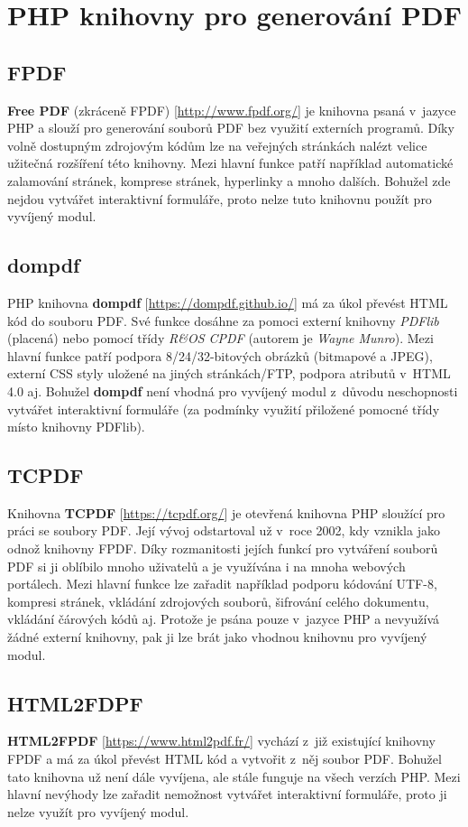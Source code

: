 \section{PHP knihovny pro generování PDF}
\subsection{FPDF}
\textbf{Free PDF} (zkráceně FPDF) [\url{http://www.fpdf.org/}] je knihovna psaná v~jazyce PHP a slouží pro generování souborů PDF bez využití externích programů. Díky volně dostupným zdrojovým kódům lze na veřejných stránkách nalézt velice užitečná rozšíření této knihovny. Mezi hlavní funkce patří například automatické zalamování stránek, komprese stránek, hyperlinky a mnoho dalších. Bohužel zde nejdou vytvářet interaktivní formuláře, proto nelze tuto knihovnu použít pro vyvíjený modul.
\subsection{dompdf}
PHP knihovna \textbf{dompdf} [\url{https://dompdf.github.io/}] má za úkol převést HTML kód do souboru PDF. Své funkce dosáhne za pomoci externí knihovny \textit{PDFlib} (placená) nebo pomocí třídy \textit{R\&OS CPDF} (autorem je \textit{Wayne Munro}). Mezi hlavní funkce patří podpora 8/24/32-bitových obrázků (bitmapové a JPEG), externí CSS styly uložené na jiných stránkách/FTP, podpora atributů v~HTML 4.0 aj. Bohužel \textbf{dompdf} není vhodná pro vyvíjený modul z~důvodu neschopnosti vytvářet interaktivní formuláře (za podmínky využití přiložené pomocné třídy místo knihovny PDFlib).
\subsection{TCPDF} \label{subsec:tcpdf}
Knihovna \textbf{TCPDF} [\url{https://tcpdf.org/}] je otevřená knihovna PHP sloužící pro práci se soubory PDF. Její vývoj odstartoval už v~roce 2002, kdy vznikla jako odnož knihovny FPDF. Díky rozmanitosti jejích funkcí pro vytváření souborů PDF si ji oblíbilo mnoho uživatelů a je využívána i na mnoha webových portálech. Mezi hlavní funkce lze zařadit například podporu kódování UTF-8, kompresi stránek, vkládání zdrojových souborů, šifrování celého dokumentu, vkládání čárových kódů  aj. Protože je psána pouze v~jazyce PHP a nevyužívá žádné externí knihovny, pak ji lze brát jako vhodnou knihovnu pro vyvíjený modul.
\subsection{HTML2FDPF}
\textbf{HTML2FPDF} [\url{https://www.html2pdf.fr/}] vychází z~již existující knihovny FPDF a má za úkol převést HTML kód a vytvořit z~něj soubor PDF. Bohužel tato knihovna už není dále vyvíjena, ale stále funguje na všech verzích PHP. Mezi hlavní nevýhody lze zařadit nemožnost vytvářet interaktivní formuláře, proto ji nelze využít pro vyvíjený modul.
